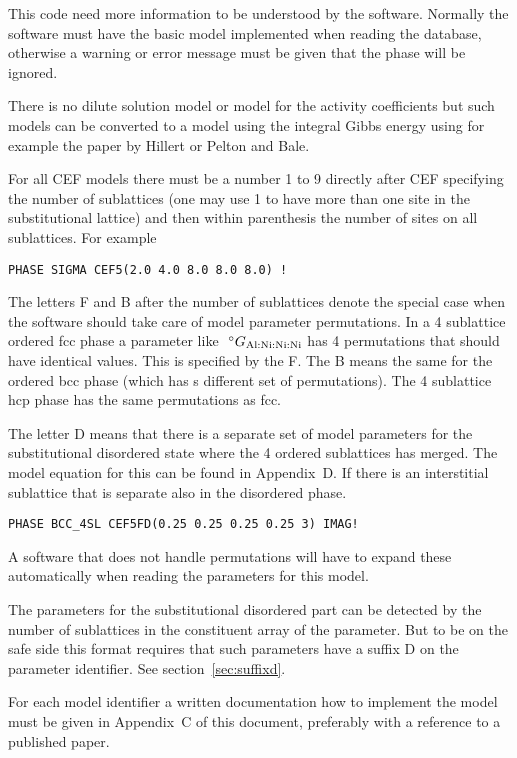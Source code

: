 \documentclass[12pt]{article}
\begin{document}
This code need more information to be understood by the software.
Normally the software must have the basic model implemented when
reading the database, otherwise a warning or error message must be
given that the phase will be ignored.

There is no dilute solution model or model for the activity
coefficients but such models can be converted to a model using the
integral Gibbs energy using for example the paper by
Hillert\cite{86Hil} or Pelton and Bale\cite{86Pel}.

For all CEF models there must be a number 1 to 9 directly after CEF
specifying the number of sublattices (one may use 1 to have more than
one site in the substitutional lattice) and then within parenthesis
the number of sites on all sublattices.  For example

\begin{verbatim}
PHASE SIGMA CEF5(2.0 4.0 8.0 8.0 8.0) !
\end{verbatim}

The letters F and B after the number of sublattices denote the special
case when the software should take care of model parameter
permutations.  In a 4 sublattice ordered fcc phase a parameter like
$~^{\circ}G_{\rm Al:Ni:Ni:Ni}$ has 4 permutations that should have
identical values.  This is specified by the F.  The B means the same
for the ordered bcc phase (which has s different set of permutations).
The 4 sublattice hcp phase has the same permutations as fcc.

The letter D means that there is a separate set of model parameters
for the substitutional disordered state where the 4 ordered sublattices
has merged.  The model equation for this can be found in Appendix~D.
If there is an interstitial sublattice that is separate also in the
disordered phase.

\begin{verbatim}
PHASE BCC_4SL CEF5FD(0.25 0.25 0.25 0.25 3) IMAG!
\end{verbatim}

A software that does not handle permutations will have to expand these
automatically when reading the parameters for this model.

The parameters for the substitutional disordered part can be detected
by the number of sublattices in the constituent array of the
parameter.  But to be on the safe side this format requires that such
parameters have a suffix D on the parameter identifier.  See
section~\ref{sec:suffixd}.

For each model identifier a written documentation how to implement the
model must be given in Appendix~C of this document, preferably with a
reference to a published paper.
\end{document}

